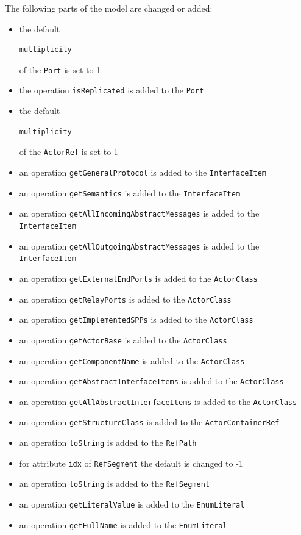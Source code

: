 The following parts of the model are changed or added:
\begin{itemize}
\item the default \begin{verbatim}multiplicity\end{verbatim} of the \texttt{Port} is set to 1
\item the operation \texttt{isReplicated} is added to the \texttt{Port}
\item the default \begin{verbatim}multiplicity\end{verbatim} of the \texttt{ActorRef} is set to 1
\item an operation \texttt{getGeneralProtocol} is added to the \texttt{InterfaceItem}
\item an operation \texttt{getSemantics} is added to the \texttt{InterfaceItem}
\item an operation \texttt{getAllIncomingAbstractMessages} is added to the \texttt{InterfaceItem}
\item an operation \texttt{getAllOutgoingAbstractMessages} is added to the \texttt{InterfaceItem}
\item an operation \texttt{getExternalEndPorts} is added to the \texttt{ActorClass}
\item an operation \texttt{getRelayPorts} is added to the \texttt{ActorClass}
\item an operation \texttt{getImplementedSPPs} is added to the \texttt{ActorClass}
\item an operation \texttt{getActorBase} is added to the \texttt{ActorClass}
\item an operation \texttt{getComponentName} is added to the \texttt{ActorClass}
\item an operation \texttt{getAbstractInterfaceItems} is added to the \texttt{ActorClass}
\item an operation \texttt{getAllAbstractInterfaceItems} is added to the \texttt{ActorClass}
\item an operation \texttt{getStructureClass} is added to the \texttt{ActorContainerRef}
\item an operation \texttt{toString} is added to the \texttt{RefPath}
\item for attribute \texttt{idx} of \texttt{RefSegment} the default is changed to -1
\item an operation \texttt{toString} is added to the \texttt{RefSegment}
\item an operation \texttt{getLiteralValue} is added to the \texttt{EnumLiteral}
\item an operation \texttt{getFullName} is added to the \texttt{EnumLiteral}
\end{itemize}

